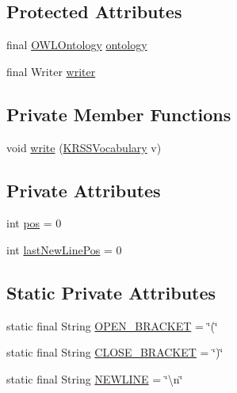 \subsection*{Protected Attributes}
\begin{DoxyCompactItemize}
\item 
final \hyperlink{interfaceorg_1_1semanticweb_1_1owlapi_1_1model_1_1_o_w_l_ontology}{O\-W\-L\-Ontology} \hyperlink{classde_1_1uulm_1_1ecs_1_1ai_1_1owlapi_1_1krssrenderer_1_1_k_r_s_s_object_renderer_a0eebb300c2e2da4f2ebb3eaf20cfaaa5}{ontology}
\item 
final Writer \hyperlink{classde_1_1uulm_1_1ecs_1_1ai_1_1owlapi_1_1krssrenderer_1_1_k_r_s_s_object_renderer_ad94353da30589e50ec3a0bc88223c766}{writer}
\end{DoxyCompactItemize}
\subsection*{Private Member Functions}
\begin{DoxyCompactItemize}
\item 
void \hyperlink{classde_1_1uulm_1_1ecs_1_1ai_1_1owlapi_1_1krssrenderer_1_1_k_r_s_s_object_renderer_a66550349128e61d7b6f0dccda9433cad}{write} (\hyperlink{enumde_1_1uulm_1_1ecs_1_1ai_1_1owlapi_1_1krssrenderer_1_1_k_r_s_s_vocabulary}{K\-R\-S\-S\-Vocabulary} v)
\end{DoxyCompactItemize}
\subsection*{Private Attributes}
\begin{DoxyCompactItemize}
\item 
int \hyperlink{classde_1_1uulm_1_1ecs_1_1ai_1_1owlapi_1_1krssrenderer_1_1_k_r_s_s_object_renderer_a8f60c281c320ae281a44527f5cc37ddd}{pos} = 0
\item 
int \hyperlink{classde_1_1uulm_1_1ecs_1_1ai_1_1owlapi_1_1krssrenderer_1_1_k_r_s_s_object_renderer_a1882dbe0b35e3fc87c27f6a5c5bd9cd4}{last\-New\-Line\-Pos} = 0
\end{DoxyCompactItemize}
\subsection*{Static Private Attributes}
\begin{DoxyCompactItemize}
\item 
static final String \hyperlink{classde_1_1uulm_1_1ecs_1_1ai_1_1owlapi_1_1krssrenderer_1_1_k_r_s_s_object_renderer_ac800449c9878eea68dcbec68a6855536}{O\-P\-E\-N\-\_\-\-B\-R\-A\-C\-K\-E\-T} = \char`\"{}(\char`\"{}
\item 
static final String \hyperlink{classde_1_1uulm_1_1ecs_1_1ai_1_1owlapi_1_1krssrenderer_1_1_k_r_s_s_object_renderer_a6b3c9830126c7ee11b6af4fa22ecaf75}{C\-L\-O\-S\-E\-\_\-\-B\-R\-A\-C\-K\-E\-T} = \char`\"{})\char`\"{}
\item 
static final String \hyperlink{classde_1_1uulm_1_1ecs_1_1ai_1_1owlapi_1_1krssrenderer_1_1_k_r_s_s_object_renderer_a5816d5a122d65e46bfce5a0809737bd4}{N\-E\-W\-L\-I\-N\-E} = \char`\"{}\textbackslash{}n\char`\"{}
\end{DoxyCompactItemize}


